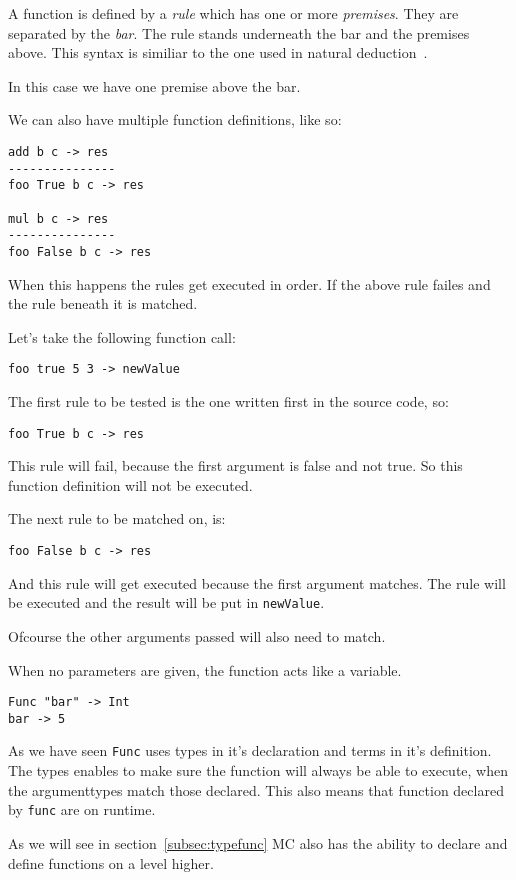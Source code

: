 A function is defined by a \emph{rule} which has one or more \emph{premises}.
They are separated by the \emph{bar}.
The rule stands underneath the bar and the premises above.
This syntax is similiar to the one used in natural deduction~\cite{}.

In this case we have one premise above the bar.

We can also have multiple function definitions, like so:
\begin{lstlisting}
add b c -> res
---------------
foo True b c -> res

mul b c -> res
---------------
foo False b c -> res
\end{lstlisting}

When this happens the rules get executed in order.
If the above rule failes and the rule beneath it is matched.

Let's take the following function call:
\begin{lstlisting}
foo true 5 3 -> newValue
\end{lstlisting}

The first rule to be tested is the one written first in the source code, so:
\begin{lstlisting}
foo True b c -> res
\end{lstlisting}
This rule will fail, because the first argument is false and not true.
So this function definition will not be executed.

The next rule to be matched on, is:
\begin{lstlisting}
foo False b c -> res
\end{lstlisting}
And this rule will get executed because the first argument matches.
The rule will be executed and the result will be put in \verb|newValue|.

Ofcourse the other arguments passed will also need to match.

When no parameters are given, the function acts like a variable.
\begin{lstlisting}
Func "bar" -> Int
bar -> 5
\end{lstlisting}

As we have seen \verb|Func| uses types in it's declaration and terms in it's definition.
The types enables to make sure the function will always be able to execute, when the argumenttypes match those declared.
This also means that function declared by \verb|func| are on runtime.

As we will see in section~\ref{subsec:typefunc} MC also has the ability to declare and define functions on a level higher.

